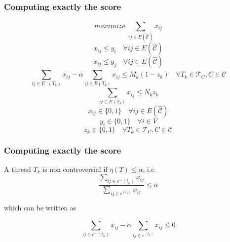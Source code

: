 \documentclass{beamer}
\begin{document}
\begin{frame}[c]
    \frametitle{Computing exactly the score}

    \begin{equation}
        maximize\; \sum^{}_{ij \in E(\hat{\mathcal{C}})} x _{ij}
    \end{equation}
    \begin{equation}
        x _{ij} \leq y_i \quad \forall ij \in E(\hat{\mathcal{C}})
    \end{equation}
    \begin{equation}
        x _{ij} \leq y_j \quad \forall ij \in E(\hat{\mathcal{C}})
    \end{equation}
    \begin{equation}
        \sum^{}_{ij \in E^{-} (T_k)} x_{ij} - \alpha \sum^{}_{ij \in E(T_k)}
        x_{ij} \leq M_k(1 -z_{k} ) \quad \forall T_{k} \in \mathcal{T} _{C}, C \in
        \mathcal{C}
    \end{equation}
    \begin{equation}
        \sum^{}_{ij \in E(T_{k} )} x_{ij} \leq N_{k} z_{k}
    \end{equation}
    \begin{equation}
        x _{ij} \in \{0, 1\} \quad \forall ij \in E(\hat{\mathcal{C}})
    \end{equation}
    \begin{equation}
        y _{i} \in  \{0, 1\} \quad \forall i \in V
    \end{equation}
    \begin{equation}
        z _{k} \in  \{0, 1\} \quad \forall T_{k} \in \mathcal{T} _{C}, C \in
        \mathcal{C}
    \end{equation}
\end{frame}

\begin{frame}[c]
    \frametitle{Computing exactly the score}
    A thread $T_{k} $ is non controversial if $\eta(T) \leq \alpha $, i.e.
    \begin{equation}
        \frac{\sum^{}_{ij \in e^{-} (t_{k} )} x_{ij} }
        {\sum^{}_{ij \in e^ (t_{k} )} x_{ij} } \leq \alpha
    \end{equation}

    which can be written as

    \begin{equation}
        \sum^{}_{ij \in e^{-} (t_{k} )} x_{ij} -
        \alpha {\sum^{}_{ij \in e^ (t_{k} )} x_{ij} } \leq 0
    \end{equation}

\end{frame}
\end{document}
